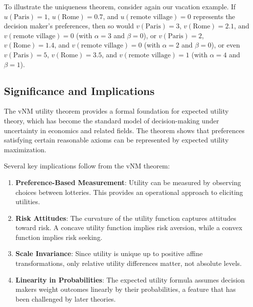 \documentclass{article}
\theoremstyle{definition}
\begin{document}
To illustrate the uniqueness theorem, consider again our vacation example. If $u(\text{Paris}) = 1$, $u(\text{Rome}) = 0.7$, and $u(\text{remote village}) = 0$ represents the decision maker's preferences, then so would $v(\text{Paris}) = 3$, $v(\text{Rome}) = 2.1$, and $v(\text{remote village}) = 0$ (with $\alpha = 3$ and $\beta = 0$), or $v(\text{Paris}) = 2$, $v(\text{Rome}) = 1.4$, and $v(\text{remote village}) = 0$ (with $\alpha = 2$ and $\beta = 0$), or even $v(\text{Paris}) = 5$, $v(\text{Rome}) = 3.5$, and $v(\text{remote village}) = 1$ (with $\alpha = 4$ and $\beta = 1$).

\subsection{Significance and Implications}

The vNM utility theorem provides a formal foundation for expected utility theory, which has become the standard model of decision-making under uncertainty in economics and related fields. The theorem shows that preferences satisfying certain reasonable axioms can be represented by expected utility maximization.

Several key implications follow from the vNM theorem:

\begin{enumerate}
    \item \textbf{Preference-Based Measurement}: Utility can be measured by observing choices between lotteries. This provides an operational approach to eliciting utilities.

    \item \textbf{Risk Attitudes}: The curvature of the utility function captures attitudes toward risk. A concave utility function implies risk aversion, while a convex function implies risk seeking.

    \item \textbf{Scale Invariance}: Since utility is unique up to positive affine transformations, only relative utility differences matter, not absolute levels.

    \item \textbf{Linearity in Probabilities}: The expected utility formula assumes decision makers weight outcomes linearly by their probabilities, a feature that has been challenged by later theories.
\end{enumerate}
\end{document}
